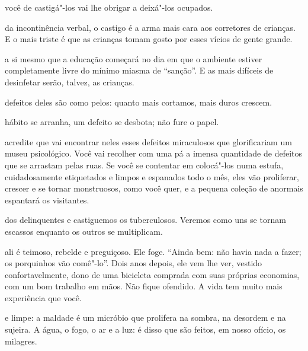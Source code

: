 \bigskip
\bigskip

 você de castigá"-los vai lhe obrigar a deixá"-los ocupados.

\bigskip
\bigskip

 da incontinência verbal, o castigo é a arma mais cara aos
corretores de crianças. E o mais triste é que as crianças tomam gosto
por esses vícios de gente grande.

\bigskip
\bigskip

 a si mesmo que a educação começará no dia em que o ambiente estiver
completamente livre do mínimo miasma de ``sanção''. E as mais difíceis
de desinfetar serão, talvez, as crianças.

\bigskip
\bigskip

 defeitos deles são como pelos: quanto mais cortamos, mais duros
crescem.

\bigskip
\bigskip

 hábito se arranha, um defeito se desbota; não fure o papel.

\bigskip
\bigskip

 acredite que vai encontrar neles esses defeitos miraculosos que
glorificariam um museu psicológico. Você vai recolher com uma pá a
imensa quantidade de defeitos que se arrastam pelas ruas. Se você se
contentar em colocá"-los numa estufa, cuidadosamente etiquetados e limpos
e espanados todo o mês, eles vão proliferar, crescer e se tornar
monstruosos, como você quer, e a pequena coleção de anormais espantará
os visitantes.

\bigskip
\bigskip

 dos delinquentes e castiguemos os tuberculosos. Veremos como
uns se tornam escassos enquanto os outros se multiplicam.

\bigskip
\bigskip

 ali é teimoso, rebelde e preguiçoso. Ele foge. ``Ainda bem: não
havia nada a fazer; os porquinhos vão comê"-lo''. Dois anos depois, ele
vem lhe ver, vestido confortavelmente, dono de uma bicicleta comprada
com suas próprias economias, com um bom trabalho em mãos. Não fique
ofendido. A vida tem muito mais experiência que você.

\bigskip
\bigskip


 e limpe: a maldade é um micróbio que prolifera na sombra, na
desordem e na sujeira. A água, o fogo, o ar e a luz: é disso que são
feitos, em nosso ofício, os milagres.

